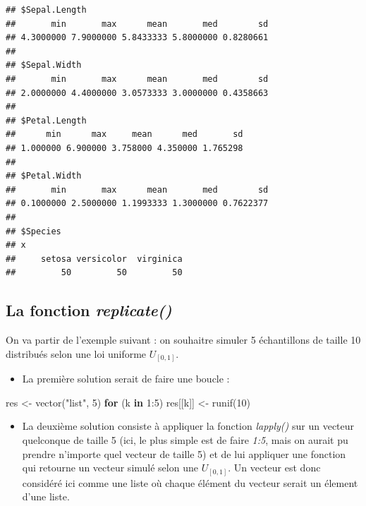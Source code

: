 \documentclass[
]{book}
\newenvironment{Shaded}{\begin{snugshade}}{\end{snugshade}}
\newcommand{\ControlFlowTok}[1]{\textcolor[rgb]{0.13,0.29,0.53}{\textbf{#1}}}
\newcommand{\DecValTok}[1]{\textcolor[rgb]{0.00,0.00,0.81}{#1}}
\newcommand{\FunctionTok}[1]{\textcolor[rgb]{0.00,0.00,0.00}{#1}}
\newcommand{\NormalTok}[1]{#1}
\newcommand{\OtherTok}[1]{\textcolor[rgb]{0.56,0.35,0.01}{#1}}
\newcommand{\SpecialCharTok}[1]{\textcolor[rgb]{0.00,0.00,0.00}{#1}}
\newcommand{\StringTok}[1]{\textcolor[rgb]{0.31,0.60,0.02}{#1}}
\providecommand{\tightlist}{%
  \setlength{\itemsep}{0pt}\setlength{\parskip}{0pt}}
\theoremstyle{definition}
\theoremstyle{definition}
\theoremstyle{definition}
\theoremstyle{definition}
\theoremstyle{remark}
\begin{document}
\begin{verbatim}
## $Sepal.Length
##       min       max      mean       med        sd 
## 4.3000000 7.9000000 5.8433333 5.8000000 0.8280661 
## 
## $Sepal.Width
##       min       max      mean       med        sd 
## 2.0000000 4.4000000 3.0573333 3.0000000 0.4358663 
## 
## $Petal.Length
##      min      max     mean      med       sd 
## 1.000000 6.900000 3.758000 4.350000 1.765298 
## 
## $Petal.Width
##       min       max      mean       med        sd 
## 0.1000000 2.5000000 1.1993333 1.3000000 0.7622377 
## 
## $Species
## x
##     setosa versicolor  virginica 
##         50         50         50
\end{verbatim}

\hypertarget{la-fonction-replicate}{%
\subsection{\texorpdfstring{La fonction \emph{replicate()}}{La fonction replicate()}}\label{la-fonction-replicate}}

On va partir de l'exemple suivant : on souhaitre simuler 5 échantillons de taille 10 distribués selon une loi uniforme \(U_{[0,1]}\).

\begin{itemize}
\tightlist
\item
  La première solution serait de faire une boucle :
\end{itemize}

\begin{Shaded}
\begin{Highlighting}[]
\NormalTok{res }\OtherTok{\textless{}{-}} \FunctionTok{vector}\NormalTok{(}\StringTok{"list"}\NormalTok{, }\DecValTok{5}\NormalTok{)}
\ControlFlowTok{for}\NormalTok{ (k }\ControlFlowTok{in} \DecValTok{1}\SpecialCharTok{:}\DecValTok{5}\NormalTok{)}
\NormalTok{  res[[k]] }\OtherTok{\textless{}{-}} \FunctionTok{runif}\NormalTok{(}\DecValTok{10}\NormalTok{)}
\end{Highlighting}
\end{Shaded}

\begin{itemize}
\tightlist
\item
  La deuxième solution consiste à appliquer la fonction \emph{lapply()} sur un vecteur quelconque de taille 5 (ici, le plus simple est de faire \emph{1:5}, mais on aurait pu prendre n'importe quel vecteur de taille 5) et de lui appliquer une fonction qui retourne un vecteur simulé selon une \(U_{[0,1]}\). Un vecteur est donc considéré ici comme une liste où chaque élément du vecteur serait un élement d'une liste.
\end{itemize}
\end{document}
